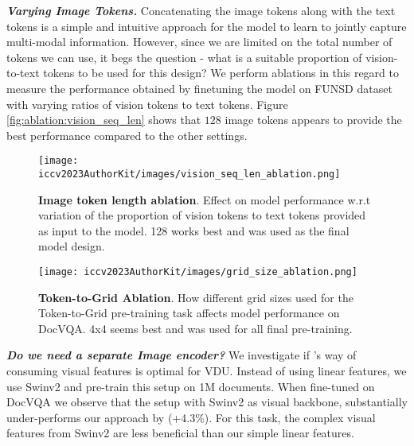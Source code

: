 \documentclass[10pt,twocolumn,letterpaper]{article}
\begin{document}
\noindent \textbf{\textit{Varying Image Tokens.}} Concatenating the image tokens along with the text tokens is a simple and intuitive approach for the model to learn to jointly capture multi-modal information. However, since we are limited on the total number of tokens we can use, it begs the question - what is a suitable proportion of vision-to-text tokens to be used for this design? We perform ablations in this regard to measure the performance obtained by finetuning the model on FUNSD dataset with varying ratios of vision tokens to text tokens. Figure \ref{fig:ablation:vision_seq_len} shows that $128$ image tokens appears to provide the best performance compared to the other settings. 








\begin{figure}[t]
  \centering
  \begin{minipage}[b]{0.4 \linewidth}
         \centering
         \texttt{[image: iccv2023AuthorKit/images/vision\_seq\_len\_ablation.png]}
         \caption{\textbf{Image token length ablation}. Effect on model performance w.r.t variation of the proportion of vision tokens to text tokens provided as input to the model. 128 works best and was used as the final model design.}
         \label{fig:ablation:vision_seq_len}
     \end{minipage}
     \hspace{0.02\linewidth}
     \begin{minipage}[b]{0.4 \linewidth}
         \centering
         \texttt{[image: iccv2023AuthorKit/images/grid\_size\_ablation.png]}
         \caption{\textbf{Token-to-Grid Ablation}. How different grid sizes used for the Token-to-Grid pre-training task affects model performance on DocVQA. 4x4 seems best and was used for all final pre-training.}
         \label{fig:ablation:token_to_grid}
     \end{minipage}

\vspace{-5mm}
\end{figure}



\noindent \textbf{\textit{Do we need a separate Image encoder?}} We investigate if \papertitle's way of consuming visual features is optimal for VDU. Instead of using linear features, we use Swinv2 \cite{Liu2021Swinv2} and pre-train this setup on 1M documents. When fine-tuned on DocVQA we observe that the setup with Swinv2 as visual backbone, substantially under-performs our approach by (+4.3\%). For this task, the complex visual features from Swinv2 are less beneficial than our simple linear features.
\end{document}
